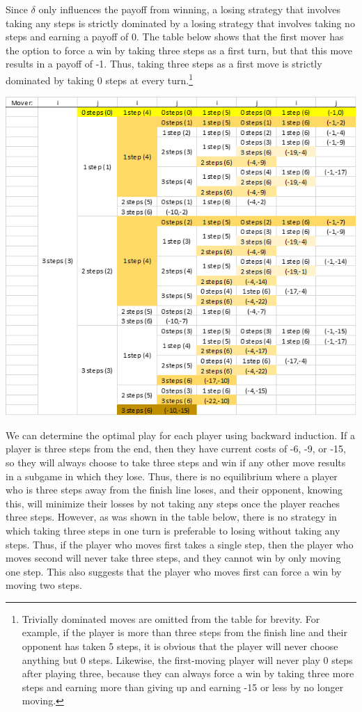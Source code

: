 \documentclass{article}
\begin{document}
\begin{enumerate}[(a)]
	Since $\delta$ only influences the payoff from winning, a losing strategy that involves taking any steps is strictly dominated by a losing strategy that involves taking no steps and earning a payoff of 0. The table below shows that the first mover has the option to force a win by taking three steps as a first turn, but that this move results in a payoff of -1. Thus, taking three steps as a first move is strictly dominated by taking 0 steps at every turn.\footnote{Trivially dominated moves are omitted from the table for brevity. For example, if the player is more than three steps from the finish line and their opponent has taken 5 steps, it is obvious that the player will never choose anything but 0 steps. Likewise, the first-moving player will never play 0 steps after playing three, because they can always force a win by taking three more steps and earning more than giving up and earning -15 or less by no longer moving.}
		\begin{center}
			\includegraphics[scale=.5]{table4a.png}
		\end{center}
	
	We can determine the optimal play for each player using backward induction. If a player is three steps from the end, then they have current costs of -6, -9, or -15, so they will always choose to take three steps and win if any other move results in a subgame in which they lose. Thus, there is no equilibrium where a player who is three steps away from the finish line loses, and their opponent, knowing this, will minimize their losses by not taking any steps once the player reaches three steps. However, as was shown in the table below, there is no strategy in which taking three steps in one turn is preferable to losing without taking any steps. Thus, if the player who moves first takes a single step, then the player who moves second will never take three steps, and they cannot win by only moving one step. This also suggests that the player who moves first can force a win by moving two steps.
	

\end{enumerate}
\end{document}
